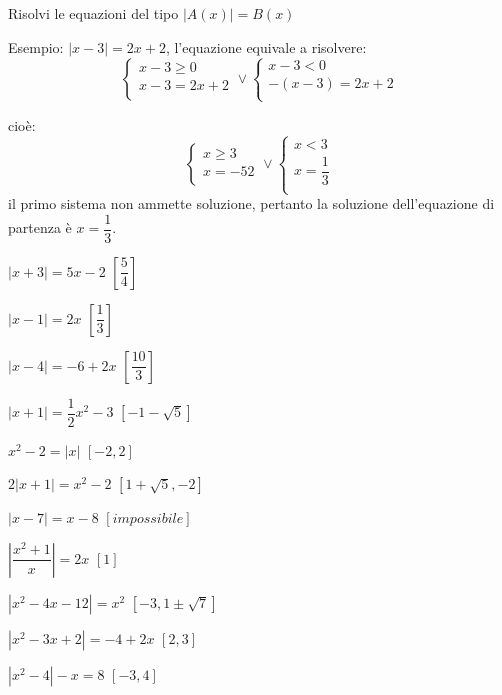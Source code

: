 \begin{esercizio}\label{ese:03.1}
\noindent Risolvi le equazioni del tipo $|A(x)|=B(x)$

Esempio:
$|x-3|=2x+2$, l'equazione equivale a risolvere:
$$
\left\lbrace 
\begin{array}{l}
x-3\geq 0 \\
x-3=2x+2\\
\end{array}
\right.
\vee
\left\lbrace 
\begin{array}{l}
x-3< 0 \\
-(x-3)=2x+2\\
\end{array}
\right.
$$      

cioè:
$$
\left\lbrace 
\begin{array}{l}
x\geq 3 \\
x=-52\\
\end{array}
\right.
\vee
\left\lbrace 
\begin{array}{l}
x< 3 \\
x=\dfrac{1}{3}\\
\end{array}
\right.
$$
il primo sistema non ammette soluzione, pertanto la soluzione dell'equazione 
di 
partenza è $    x=\dfrac{1}{3}$.
\begin{multicols}{2}
\begin{enumeratea}
\item $\left| x+3 \right| =5x-2 $ \hfill $\left[ \dfrac{5}{4}\right] $
\item $\left| x-1 \right| =2x $ \hfill $\left[ \dfrac{1}{3}\right] $
\item $\left| x-4 \right| =-6+2x $ \hfill $\left[ \dfrac{10}{3}\right] $
\item $\left| x+1 \right| =\dfrac{1}{2}x^2-3 $ \hfill $\left[ 
-1-\sqrt{5}\right] 
$
\item $x^2-2= \left| x \right| $ \hfill $\left[ -2, 2\right] $
\item $2\left| x+1 \right| =x^2-2 $ \hfill $\left[1+\sqrt{5}, -2\right] $
\item $\left| x-7 \right| =x-8 $ \hfill $\left[ impossibile\right] $
\item $\left| \dfrac{x^2+1}{x} \right| =2x $ \hfill $\left[ 1 \right] $
\item $\left| x^2-4x-12 \right| =x^2 $ \hfill $\left[ -3, 1\pm 
\sqrt{7}\right] $
\item $\left| x^2-3x+2 \right| =-4+2x $ \hfill $\left[ 2, 3\right] $
\item $\left| x^2-4 \right| -x=8 $ \hfill $\left[ -3, 4\right] $
\end{enumeratea}
\end{multicols}
\end{esercizio}

